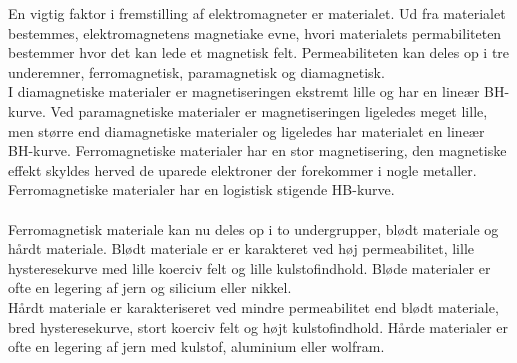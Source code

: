 
En vigtig faktor i fremstilling af elektromagneter er materialet. Ud fra materialet bestemmes, elektromagnetens magnetiake evne, hvori materialets permabiliteten bestemmer hvor det kan lede et magnetisk felt. Permeabiliteten kan deles op i tre underemner, ferromagnetisk, paramagnetisk og diamagnetisk. \\
I diamagnetiske materialer er magnetiseringen ekstremt lille og har en lineær BH-kurve. Ved paramagnetiske materialer er magnetiseringen ligeledes meget lille, men større end diamagnetiske materialer og ligeledes har materialet en lineær BH-kurve. Ferromagnetiske materialer har en stor magnetisering, den magnetiske effekt skyldes herved de uparede elektroner der forekommer i nogle metaller. Ferromagnetiske materialer har en logistisk stigende HB-kurve.\\
  \\
Ferromagnetisk materiale kan nu deles op i to undergrupper, blødt materiale og hårdt materiale. Blødt materiale er er karakteret ved høj permeabilitet, lille hysteresekurve med lille koerciv felt og lille kulstofindhold. Bløde materialer er ofte en legering af jern og silicium eller nikkel.\\
Hårdt materiale er karakteriseret ved mindre permeabilitet end blødt materiale, bred hysteresekurve, stort koerciv felt og højt kulstofindhold. Hårde materialer er ofte en legering af jern med kulstof, aluminium eller wolfram. 
